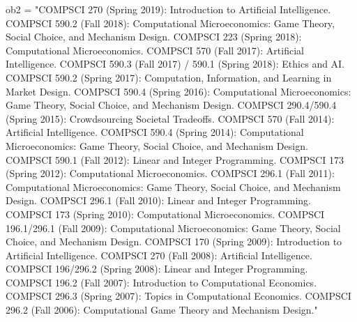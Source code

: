 \documentclass[11pt]{article}
\begin{document}
ob2 = "COMPSCI 270 (Spring 2019): Introduction to Artificial
Intelligence. COMPSCI 590.2 (Fall 2018): Computational Microeconomics:
Game Theory, Social Choice, and Mechanism Design. COMPSCI 223 (Spring
2018): Computational Microeconomics. COMPSCI 570 (Fall 2017): Artificial
Intelligence. COMPSCI 590.3 (Fall 2017) / 590.1 (Spring 2018): Ethics
and AI. COMPSCI 590.2 (Spring 2017): Computation, Information, and
Learning in Market Design. COMPSCI 590.4 (Spring 2016): Computational
Microeconomics: Game Theory, Social Choice, and Mechanism Design.
COMPSCI 290.4/590.4 (Spring 2015): Crowdsourcing Societal Tradeoffs.
COMPSCI 570 (Fall 2014): Artificial Intelligence. COMPSCI 590.4 (Spring
2014): Computational Microeconomics: Game Theory, Social Choice, and
Mechanism Design. COMPSCI 590.1 (Fall 2012): Linear and Integer
Programming. COMPSCI 173 (Spring 2012): Computational Microeconomics.
COMPSCI 296.1 (Fall 2011): Computational Microeconomics: Game Theory,
Social Choice, and Mechanism Design. COMPSCI 296.1 (Fall 2010): Linear
and Integer Programming. COMPSCI 173 (Spring 2010): Computational
Microeconomics. COMPSCI 196.1/296.1 (Fall 2009): Computational
Microeconomics: Game Theory, Social Choice, and Mechanism Design.
COMPSCI 170 (Spring 2009): Introduction to Artificial Intelligence.
COMPSCI 270 (Fall 2008): Artificial Intelligence. COMPSCI 196/296.2
(Spring 2008): Linear and Integer Programming. COMPSCI 196.2 (Fall
2007): Introduction to Computational Economics. COMPSCI 296.3 (Spring
2007): Topics in Computational Economics. COMPSCI 296.2 (Fall 2006):
Computational Game Theory and Mechanism Design."
\end{document}
